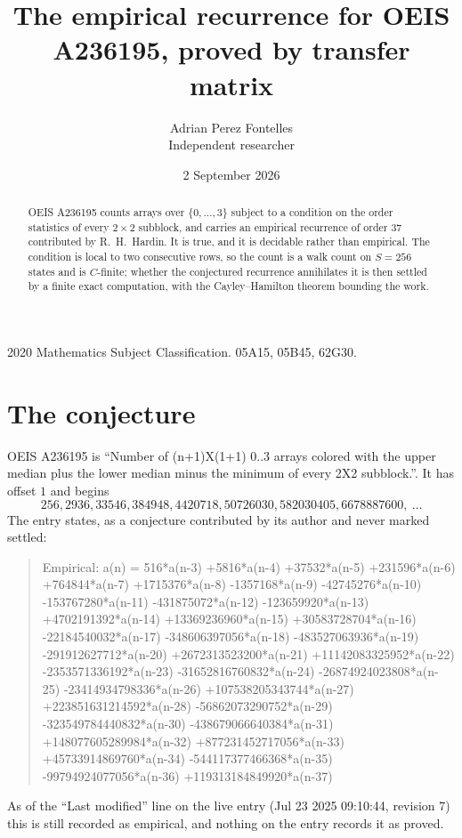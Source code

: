 \documentclass[11pt,a4paper]{article}
\title{The empirical recurrence for OEIS A236195, proved by transfer matrix}
\author{Adrian Perez Fontelles\\ \small Independent researcher}
\date{2 September 2026}
\theoremstyle{plain}
\theoremstyle{definition}
\begin{document}
\maketitle

\begin{abstract}
OEIS A236195 counts arrays over $\{0,\dots,3\}$ subject to a condition on the order
statistics of every $2\times2$ subblock, and carries an empirical recurrence of order
$37$ contributed by R.~H.~Hardin. It is true, and it is decidable rather than empirical.
The condition is local to two consecutive rows, so the count is a walk count on $S=256$
states and is $C$-finite; whether the conjectured recurrence annihilates it is then settled by
a finite exact computation, with the Cayley--Hamilton theorem bounding the work.
\end{abstract}

\noindent\small 2020 Mathematics Subject Classification. 05A15, 05B45, 62G30.\normalsize

\section{The conjecture}

OEIS A236195 is ``Number of (n+1)X(1+1) 0..3 arrays colored with the upper median plus the lower median minus the minimum of every 2X2 subblock.''. It has offset $1$ and begins
\[
256, 2936, 33546, 384948, 4420718, 50726030, 582030405, 6678887600,\ \dots
\]
The entry states, as a conjecture contributed by its author and never marked settled:
\begin{quote}
Empirical: a(n) = 516*a(n-3) +5816*a(n-4) +37532*a(n-5) +231596*a(n-6) +764844*a(n-7) +1715376*a(n-8) -1357168*a(n-9) -42745276*a(n-10) -153767280*a(n-11) -431875072*a(n-12) -123659920*a(n-13) +4702191392*a(n-14) +13369236960*a(n-15) +30583728704*a(n-16) -22184540032*a(n-17) -348606397056*a(n-18) -483527063936*a(n-19) -291912627712*a(n-20) +2672313523200*a(n-21) +11142083325952*a(n-22) -2353571336192*a(n-23) -31652816760832*a(n-24) -26874924023808*a(n-25) -23414934798336*a(n-26) +107538205343744*a(n-27) +223851631214592*a(n-28) -56862073290752*a(n-29) -323549784440832*a(n-30) -438679066640384*a(n-31) +148077605289984*a(n-32) +877231452717056*a(n-33) +45733914869760*a(n-34) -544117377466368*a(n-35) -99794924077056*a(n-36) +119313184849920*a(n-37)
\end{quote}
As of the ``Last modified'' line on the live entry (Jul 23 2025 09:10:44, revision 7) this is still
recorded as empirical, and nothing on the entry records it as proved.
\end{document}

